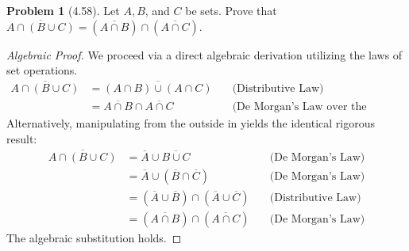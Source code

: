 \documentclass[11pt]{article}
\theoremstyle{definition}
\newtheorem{problem}{Problem}
\begin{document}
\begin{problem}[4.58]
Let $A, B$, and $C$ be sets. Prove that $\overline{A \cap (B \cup C)} = (\overline{A \cap B}) \cap (\overline{A \cap C})$.
\end{problem}
\begin{proof}[Algebraic Proof]
We proceed via a direct algebraic derivation utilizing the laws of set operations.
\begin{align*}
\overline{A \cap (B \cup C)} &= \overline{(A \cap B) \cup (A \cap C)} \quad &\text{(Distributive Law)} \\
&= \overline{A \cap B} \cap \overline{A \cap C} \quad &\text{(De Morgan's Law over the Union)}
\end{align*}
Alternatively, manipulating from the outside in yields the identical rigorous result:
\begin{align*}
\overline{A \cap (B \cup C)} &= \overline{A} \cup \overline{B \cup C} \quad &\text{(De Morgan's Law)} \\
&= \overline{A} \cup (\overline{B} \cap \overline{C}) \quad &\text{(De Morgan's Law)} \\
&= (\overline{A} \cup \overline{B}) \cap (\overline{A} \cup \overline{C}) \quad &\text{(Distributive Law)} \\
&= (\overline{A \cap B}) \cap (\overline{A \cap C}) \quad &\text{(De Morgan's Law)}
\end{align*}
The algebraic substitution holds.
\end{proof}
\end{document}
